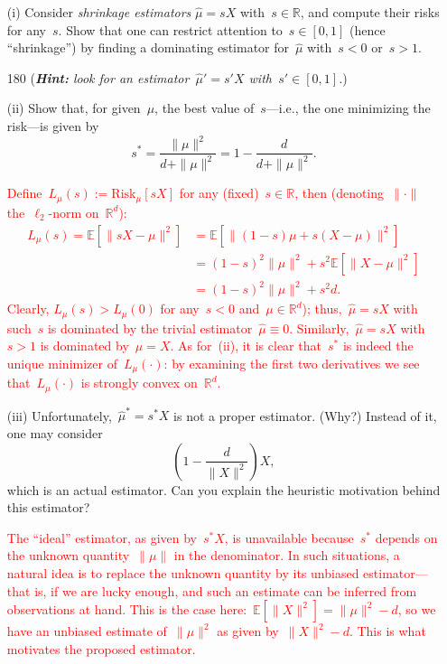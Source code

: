 \documentclass[11pt]{article}
\newcommand{\R}{\mathds{R}}
\newcommand{\E}{\mathds{E}}
\begin{document}
\begin{itemize}

\item[(i)] 
Consider {\em shrinkage estimators}
$
\hat\mu =  sX
$
with~$s \in \R$, and compute their risks for any~$s$.
Show that one can restrict attention to~$s \in [0,1]$ (hence ``shrinkage'') by finding a dominating estimator for~$\hat\mu$ with~$s < 0$ or~$s > 1$. 
\begin{turn}{180}
({\em {\bf Hint:} look for an estimator~$\hat\mu' =  s'X$ with~$s' \in [0,1]$.})
\end{turn}


\item[(ii)] 
Show that, for given~$\mu$, the best value of~$s$---i.e., the one minimizing the risk---is given by
\[
s^* = \frac{\|\mu\|^2}{d + \|\mu\|^2} 
= 1-\frac{d}{d + \|\mu\|^2}.
\]

\textcolor{red}{
Define~$L_\mu(s):=\text{Risk}_{\mu}[sX]$ for any (fixed)~$s \in \R$, then (denoting~$\|\cdot\|$ the~$\ell_2$-norm on~$\R^d$):
\[
\begin{aligned}
L_{\mu}(s) = \E[\| sX-\mu \|^2 ] 
&= \E[\| (1-s)\mu + s(X-\mu) \|^2 ]  \\
&= (1-s)^2 \|\mu\|^2 + s^2\E[\|X-\mu\|^2] \\
&= (1-s)^2 \|\mu\|^2 + s^2 d.
\end{aligned}
\]
Clearly, $L_{\mu}(s) > L_{\mu}(0)$ for any~$s < 0$ and~$\mu \in \R^d$);  thus,~$\hat \mu = sX$ with such~$s$ is dominated by the trivial estimator~$\hat\mu\equiv 0$. Similarly,~$\hat \mu = sX$ with~$s > 1$ is dominated by~$\hat\mu = X$. As for~(ii), it is clear that~$s^*$ is indeed the unique minimizer of~$L_{\mu}(\cdot)$: by examining the first two derivatives we see that~$L_{\mu}(\cdot)$ is strongly convex on~$\R^d$.
}

\item[(iii)] Unfortunately,~$\hat \mu^* = s^* X$ is not a proper estimator. (Why?) 
Instead of it, one may consider
\[
\left(1-\frac{d}{\|X\|^2}\right) X,
\]
which is an actual estimator. Can you explain the heuristic motivation behind this estimator?

\textcolor{red}{
The ``ideal'' estimator, as given by~$s^* X$, is unavailable because~$s^*$ depends on the unknown quantity~$\|\mu\|$ in the denominator. In such situations, a natural idea is to replace the unknown quantity by its unbiased estimator---that is, if we are lucky enough, and such an estimate can be inferred from observations at hand. 
This is the case here:~$\E[\|X\|^2] = \|\mu\|^2 - d$, so we have an unbiased estimate of~$\|\mu\|^2$ as given by~$\| X \|^2 - d$. This is what motivates the proposed estimator.
}\\


\end{itemize}
\end{document}
